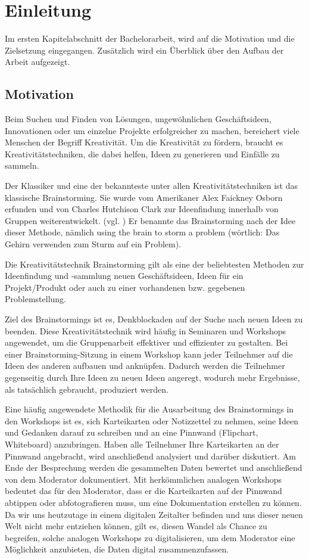 \chapter{Einleitung}
\label{sec:einleitung}
Im ersten Kapitelabschnitt der Bachelorarbeit, wird auf die Motivation und die Zielsetzung eingegangen. Zusätzlich wird ein Überblick über den Aufbau der Arbeit aufgezeigt.

\section{Motivation}
\label{sec:motivation}
Beim Suchen und Finden von Lösungen, ungewöhnlichen Geschäftsideen, Innovationen oder um einzelne Projekte erfolgreicher zu machen, bereichert viele Menschen der Begriff Kreativität. Um die Kreativität zu fördern, braucht es Kreativitätstechniken, die dabei helfen, Ideen zu generieren und Einfälle zu sammeln.\bigskip

Der Klassiker und eine der bekannteste unter allen Kreativitätstechniken ist das klassische Brainstorming. Sie wurde vom Amerikaner Alex Faickney Osborn erfunden und von Charles Hutchison Clark zur Ideenfindung innerhalb von Gruppen weiterentwickelt. 
(vgl. \cite{Ben.o.J.}) \glqq Er benannte das Brainstorming nach der Idee dieser Methode, nämlich using the brain to storm a problem (wörtlich: Das Gehirn verwenden zum Sturm auf ein Problem).\grqq{} \cite{Pas2012}\bigskip

Die Kreativitätstechnik Brainstorming gilt als eine der beliebtesten Methoden zur Ideenfindung und -sammlung neuen Geschäftsideen, Ideen für ein Projekt/Produkt oder auch zu einer vorhandenen bzw. gegebenen Problemstellung.\bigskip

Ziel des Brainstormings ist es, Denkblockaden auf der Suche nach neuen Ideen zu beenden. Diese Kreativitätstechnik wird häufig in Seminaren und Workshops angewendet, um die Gruppenarbeit effektiver und effizienter zu gestalten. Bei einer Brainstorming-Sitzung in einem Workshop kann jeder Teilnehmer auf die Ideen des anderen aufbauen und anknüpfen. Dadurch werden die Teilnehmer gegenseitig durch Ihre Ideen zu neuen Ideen angeregt, wodurch mehr Ergebnisse, als tatsächlich gebraucht, produziert werden.\bigskip

Eine häufig angewendete Methodik für die Ausarbeitung des Brainstormings in den Workshops ist es, sich Karteikarten oder Notizzettel zu nehmen, seine Ideen und Gedanken darauf zu schreiben und an eine Pinnwand (Flipchart, Whiteboard) anzubringen. Haben alle Teilnehmer Ihre Karteikarten an der Pinnwand angebracht, wird anschließend analysiert und darüber diskutiert. Am Ende der Besprechung werden die gesammelten Daten bewertet und anschließend von dem Moderator dokumentiert. Mit herkömmlichen analogen Workshops bedeutet das für den Moderator, dass er die Karteikarten auf der Pinnwand abtippen oder abfotografieren muss, um eine Dokumentation erstellen zu können. Da wir uns heutzutage in einem digitalen Zeitalter befinden und uns dieser neuen Welt nicht mehr entziehen können, gilt es, diesen Wandel als Chance zu begreifen, solche analogen Workshops zu digitalisieren, um dem Moderator eine Möglichkeit anzubieten, die Daten digital zusammenzufassen.

